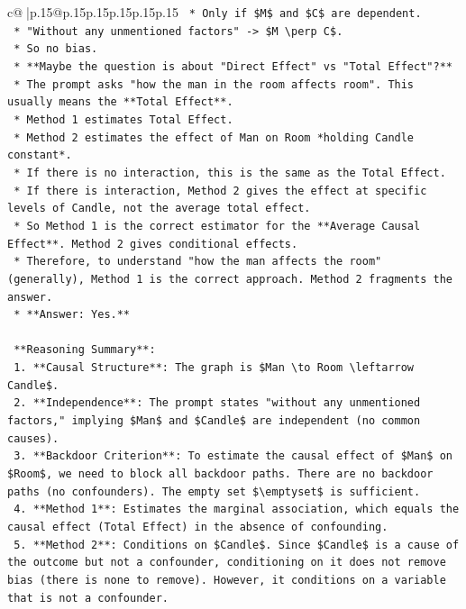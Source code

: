 \documentclass{article}
\begin{document}
{\begin{supertabular}{c@{$\;$}|p{.15\linewidth}@{}p{.15\linewidth}p{.15\linewidth}p{.15\linewidth}p{.15\linewidth}p{.15\linewidth}}
{{{\texttt{    *   Only if \$M\$ and \$C\$ are dependent.} \\
\texttt{    *   "Without any unmentioned factors" {-}> \$M \textbackslash{}perp C\$.} \\
\texttt{    *   So no bias.} \\
\texttt{    *   **Maybe the question is about "Direct Effect" vs "Total Effect"?**} \\
\texttt{    *   The prompt asks "how the man in the room affects room". This usually means the **Total Effect**.} \\
\texttt{    *   Method 1 estimates Total Effect.} \\
\texttt{    *   Method 2 estimates the effect of Man on Room *holding Candle constant*.} \\
\texttt{    *   If there is no interaction, this is the same as the Total Effect.} \\
\texttt{    *   If there is interaction, Method 2 gives the effect at specific levels of Candle, not the average total effect.} \\
\texttt{    *   So Method 1 is the correct estimator for the **Average Causal Effect**. Method 2 gives conditional effects.} \\
\texttt{    *   Therefore, to understand "how the man affects the room" (generally), Method 1 is the correct approach. Method 2 fragments the answer.} \\
\texttt{    *   **Answer: Yes.**} \\
\\ 
\texttt{    **Reasoning Summary**:} \\
\texttt{    1.  **Causal Structure**: The graph is \$Man \textbackslash{}to Room \textbackslash{}leftarrow Candle\$.} \\
\texttt{    2.  **Independence**: The prompt states "without any unmentioned factors," implying \$Man\$ and \$Candle\$ are independent (no common causes).} \\
\texttt{    3.  **Backdoor Criterion**: To estimate the causal effect of \$Man\$ on \$Room\$, we need to block all backdoor paths. There are no backdoor paths (no confounders). The empty set \$\textbackslash{}emptyset\$ is sufficient.} \\
\texttt{    4.  **Method 1**: Estimates the marginal association, which equals the causal effect (Total Effect) in the absence of confounding.} \\
\texttt{    5.  **Method 2**: Conditions on \$Candle\$. Since \$Candle\$ is a cause of the outcome but not a confounder, conditioning on it does not remove bias (there is none to remove). However, it conditions on a variable that is not a confounder.} \\
}}}
\end{supertabular}}
\end{document}
